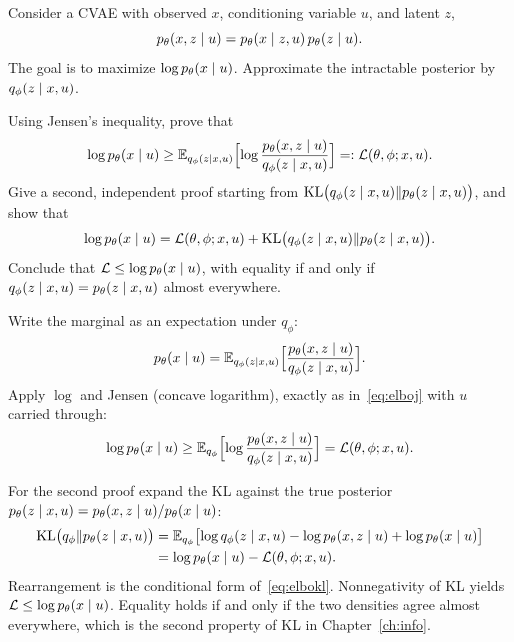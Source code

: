 \begin{hwqbox}
Consider a CVAE with observed $x$, conditioning variable $u$, and latent $z$,
\[
p_\theta(x,z\mid u)=p_\theta(x\mid z,u)\,p_\theta(z\mid u).
\]
The goal is to maximize $\log p_\theta(x\mid u)$. Approximate the intractable posterior by $q_\phi(z\mid x,u)$.

Using Jensen's inequality, prove that
\[
\log p_\theta(x\mid u)
\ge
\mathbb{E}_{q_\phi(z\mid x,u)}\Bigl[\log\frac{p_\theta(x,z\mid u)}{q_\phi(z\mid x,u)}\Bigr]
=:\mathcal L(\theta,\phi;x,u).
\]
Give a second, independent proof starting from
$\mathrm{KL}\bigl(q_\phi(z\mid x,u)\Vert p_\theta(z\mid x,u)\bigr)$, and show that
\[
\log p_\theta(x\mid u)
=\mathcal L(\theta,\phi;x,u)
+\mathrm{KL}\bigl(q_\phi(z\mid x,u)\Vert p_\theta(z\mid x,u)\bigr).
\]
Conclude that $\mathcal L\le\log p_\theta(x\mid u)$, with equality if and only if
$q_\phi(z\mid x,u)=p_\theta(z\mid x,u)$ almost everywhere.
\end{hwqbox}
\begin{hwsolbox}
Write the marginal as an expectation under $q_\phi$:
\[
p_\theta(x\mid u)
=\mathbb{E}_{q_\phi(z\mid x,u)}\Bigl[\frac{p_\theta(x,z\mid u)}{q_\phi(z\mid x,u)}\Bigr].
\]
Apply $\log$ and Jensen (concave logarithm), exactly as in~\eqref{eq:elboj} with $u$ carried through:
\[
\log p_\theta(x\mid u)
\ge
\mathbb{E}_{q_\phi}\Bigl[\log\frac{p_\theta(x,z\mid u)}{q_\phi(z\mid x,u)}\Bigr]
=\mathcal L(\theta,\phi;x,u).
\]

For the second proof expand the KL against the true posterior
$p_\theta(z\mid x,u)=p_\theta(x,z\mid u)/p_\theta(x\mid u)$:
\begin{align*}
\mathrm{KL}\bigl(q_\phi\Vert p_\theta(z\mid x,u)\bigr)
&=\mathbb{E}_{q_\phi}\bigl[
\log q_\phi(z\mid x,u)
-\log p_\theta(x,z\mid u)
+\log p_\theta(x\mid u)
\bigr]\\
&=\log p_\theta(x\mid u)-\mathcal L(\theta,\phi;x,u).
\end{align*}
Rearrangement is the conditional form of~\eqref{eq:elbokl}. Nonnegativity of KL yields
$\mathcal L\le\log p_\theta(x\mid u)$. Equality holds if and only if the two densities agree almost everywhere, which is the second property of KL in Chapter~\ref{ch:info}.
\end{hwsolbox}

